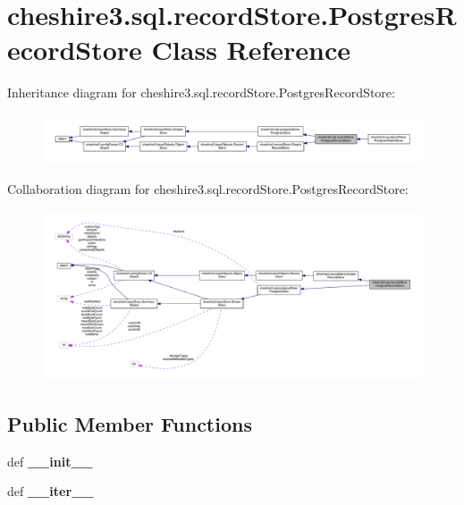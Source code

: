 \hypertarget{classcheshire3_1_1sql_1_1record_store_1_1_postgres_record_store}{\section{cheshire3.\-sql.\-record\-Store.\-Postgres\-Record\-Store Class Reference}
\label{classcheshire3_1_1sql_1_1record_store_1_1_postgres_record_store}
}


Inheritance diagram for cheshire3.\-sql.\-record\-Store.\-Postgres\-Record\-Store\-:
\nopagebreak
\begin{figure}[H]
\begin{center}
\leavevmode
\includegraphics[width=350pt]{classcheshire3_1_1sql_1_1record_store_1_1_postgres_record_store__inherit__graph}
\end{center}
\end{figure}


Collaboration diagram for cheshire3.\-sql.\-record\-Store.\-Postgres\-Record\-Store\-:
\nopagebreak
\begin{figure}[H]
\begin{center}
\leavevmode
\includegraphics[width=350pt]{classcheshire3_1_1sql_1_1record_store_1_1_postgres_record_store__coll__graph}
\end{center}
\end{figure}
\subsection*{Public Member Functions}
\begin{DoxyCompactItemize}
\item 
\hypertarget{classcheshire3_1_1sql_1_1record_store_1_1_postgres_record_store_ac90cb62d74094cc25de3779d2a9af2e1}{def {\bfseries \-\_\-\-\_\-init\-\_\-\-\_\-}}\label{classcheshire3_1_1sql_1_1record_store_1_1_postgres_record_store_ac90cb62d74094cc25de3779d2a9af2e1}

\item 
\hypertarget{classcheshire3_1_1sql_1_1record_store_1_1_postgres_record_store_aa64d1fa43efeeb8a8d78919ea30402d3}{def {\bfseries \-\_\-\-\_\-iter\-\_\-\-\_\-}}\label{classcheshire3_1_1sql_1_1record_store_1_1_postgres_record_store_aa64d1fa43efeeb8a8d78919ea30402d3}

\end{DoxyCompactItemize}
